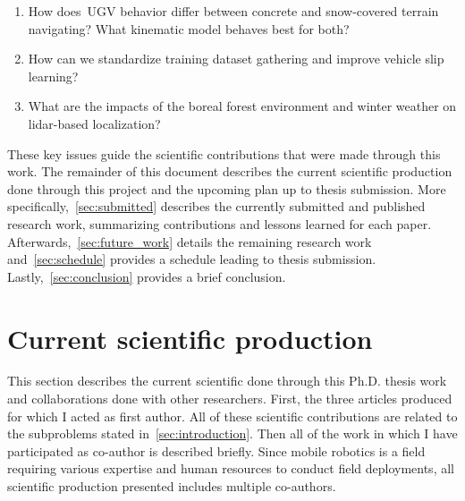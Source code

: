 \documentclass[12pt,letterpaper,oneside]{article}
\begin{document}
\begin{enumerate}\bfseries
	\item How does~\ac{UGV} behavior differ between concrete and snow-covered terrain navigating? What kinematic model behaves best for both?
	\item How can we standardize training dataset gathering and improve vehicle slip learning?
	\item What are the impacts of the boreal forest environment and winter weather on lidar-based localization?
\end{enumerate}

These key issues guide the scientific contributions that were made through this work.
The remainder of this document describes the current scientific production done through this project and the upcoming plan up to thesis submission.
More specifically,~\autoref{sec:submitted} describes the currently submitted and published research work, summarizing contributions and lessons learned for each paper. 
Afterwards,~\autoref{sec:future_work} details the remaining research work and~\autoref{sec:schedule} provides a schedule leading to thesis submission.
Lastly,~\autoref{sec:conclusion} provides a brief conclusion.


\section{Current scientific production}
\label{sec:submitted}

This section describes the current scientific done through this Ph.D. thesis work and collaborations done with other researchers. 
First, the three articles produced for which I acted as first author.
All of these scientific contributions are related to the subproblems stated in~\autoref{sec:introduction}.
Then all of the work in which I have participated as co-author is described briefly.
Since mobile robotics is a field requiring various expertise and human resources to conduct field deployments, all scientific production presented includes multiple co-authors.

\end{document}
